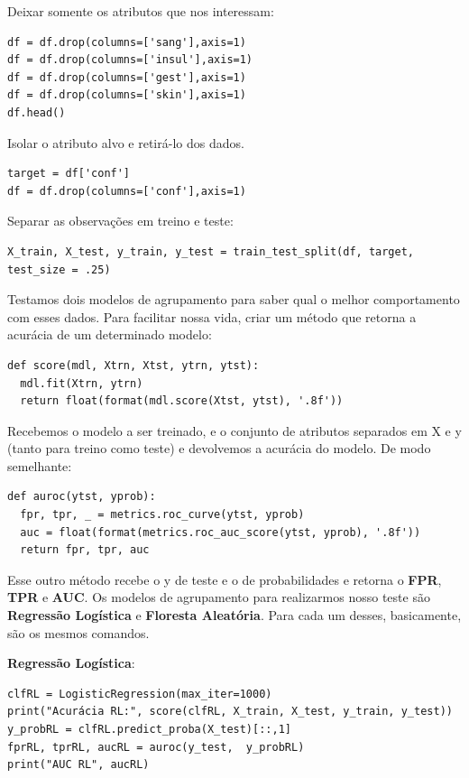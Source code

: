Deixar somente os atributos que nos interessam:
\begin{lstlisting}[]
df = df.drop(columns=['sang'],axis=1)
df = df.drop(columns=['insul'],axis=1)
df = df.drop(columns=['gest'],axis=1)
df = df.drop(columns=['skin'],axis=1)
df.head()
\end{lstlisting}

Isolar o atributo alvo e retirá-lo dos dados. 
\begin{lstlisting}[]
target = df['conf']
df = df.drop(columns=['conf'],axis=1)
\end{lstlisting}

Separar as observações em treino e teste:
\begin{lstlisting}[]
X_train, X_test, y_train, y_test = train_test_split(df, target, test_size = .25)
\end{lstlisting}

Testamos dois modelos de agrupamento para saber qual o melhor comportamento com esses dados. Para facilitar nossa vida, criar um método que retorna a acurácia de um determinado modelo:
\begin{lstlisting}[]
def score(mdl, Xtrn, Xtst, ytrn, ytst):
  mdl.fit(Xtrn, ytrn)
  return float(format(mdl.score(Xtst, ytst), '.8f'))
\end{lstlisting}

Recebemos o modelo a ser treinado, e o conjunto de atributos separados em X e y (tanto para treino como teste) e devolvemos a acurácia do modelo. De modo semelhante:
\begin{lstlisting}[]
def auroc(ytst, yprob):
  fpr, tpr, _ = metrics.roc_curve(ytst, yprob)
  auc = float(format(metrics.roc_auc_score(ytst, yprob), '.8f'))
  return fpr, tpr, auc 
\end{lstlisting}

Esse outro método recebe o y de teste e o de probabilidades e retorna o \textbf{FPR}, \textbf{TPR} e \textbf{AUC}. Os modelos de agrupamento para realizarmos nosso teste são \textbf{Regressão Logística} e \textbf{Floresta Aleatória}. Para cada um desses, basicamente, são os mesmos comandos.

\textbf{Regressão Logística}:
\begin{lstlisting}[]
clfRL = LogisticRegression(max_iter=1000)
print("Acurácia RL:", score(clfRL, X_train, X_test, y_train, y_test))
y_probRL = clfRL.predict_proba(X_test)[::,1]
fprRL, tprRL, aucRL = auroc(y_test,  y_probRL)
print("AUC RL", aucRL)
\end{lstlisting}

